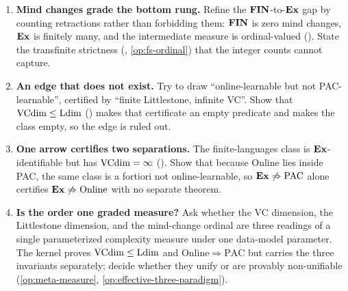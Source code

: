 \begin{enumerate}[leftmargin=*,itemsep=3pt]
\item \textbf{Mind changes grade the bottom rung.} Refine the $\mathbf{FIN}$-to-$\mathbf{Ex}$ gap by counting retractions rather than forbidding them: $\mathbf{FIN}$ is zero mind changes, $\mathbf{Ex}$ is finitely many, and the intermediate measure is ordinal-valued (). State the transfinite strictness (\cite{FreivaldsSmith1993}, \cref{op:fs-ordinal}) that the integer counts cannot capture.

\item \textbf{An edge that does not exist.} Try to draw ``online-learnable but not PAC-learnable'', certified by ``finite Littlestone, infinite VC''. Show that $\mathrm{VCdim} \le \mathrm{Ldim}$ () makes that certificate an empty predicate and  makes the class empty, so the edge is ruled out.

\item \textbf{One arrow certifies two separations.} The finite-languages class is $\mathbf{Ex}$-identifiable but has $\mathrm{VCdim} = \infty$ (). Show that because Online lies inside PAC, the same class is a fortiori not online-learnable, so $\mathbf{Ex} \not\Rightarrow \mathrm{PAC}$ alone certifies $\mathbf{Ex} \not\Rightarrow \text{Online}$ with no separate theorem.

\item \textbf{Is the order one graded measure?} Ask whether the VC dimension, the Littlestone dimension, and the mind-change ordinal are three readings of a single parameterized complexity measure under one data-model parameter. The kernel proves $\mathrm{VCdim} \le \mathrm{Ldim}$ and $\text{Online} \Rightarrow \mathrm{PAC}$ but carries the three invariants separately; decide whether they unify or are provably non-unifiable (\cref{op:meta-measure}, \cref{op:effective-three-paradigm}).
\end{enumerate}
